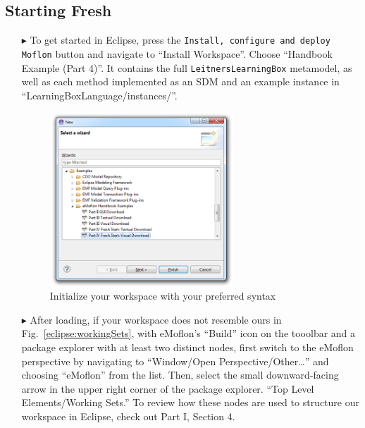 \subsection{Starting Fresh}
\label{sec:loadSourceMeta}
\begin{itemize}

\item[$\blacktriangleright$] To get started in Eclipse, press the \texttt{Install, configure and deploy Moflon} button and navigate to ``Install Workspace''. Choose ``Handbook Example (Part 4)''. It contains the full \texttt{LeitnersLearningBox} metamodel, as well as each method implemented as an SDM and an example instance in ``LearningBoxLanguage/instances/''.

\begin{figure}[htbp]
\begin{center}
  \includegraphics[width=0.65\textwidth]{eclipse_part4FreshWizardDownload}
  \caption{Initialize your workspace with your preferred syntax}
  \label{eclipse:downPartIV}
\end{center}
\end{figure}

\vspace{0.5cm}

\item[$\blacktriangleright$] After loading, if your workspace does not resemble ours in Fig.~\ref{eclipse:workingSets}, with eMoflon's ``Build'' icon on the
tooolbar and a package explorer with at least two distinct nodes, first switch to the eMoflon perspective by navigating to ``Window/Open
Perspective/Other\ldots'' and choosing ``eMoflon'' from the list. Then, select the small downward-facing arrow in the upper right corner of the package
explorer. ``Top Level Elements/Working Sets.'' To review how these nodes are used to structure our workspace in Eclipse, check out Part I, Section 4.


\end{itemize}
